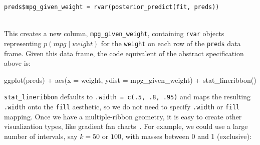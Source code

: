 \documentclass[journal]{vgtc}                     %
\newenvironment{centerverbatim}{%
\setlength{\parskip}{.4\belowdisplayskip}%
\vspace{.55\abovedisplayskip}%
\noindent%
\small%
\centering%
\varwidth{\linewidth}%
\verbatim
}{%
\endverbatim%
\endvarwidth%
\par%
\hfill\break%
}
\begin{document}
\begin{minipage}{\columnwidth}
\vspace{\abovedisplayskip}
\small
\centering
\begin{verbatim}
preds$mpg_given_weight = rvar(posterior_predict(fit, preds))
\end{verbatim}
\end{minipage}\vspace{\belowdisplayskip}\\
This creates a new column, \texttt{mpg\_given\_weight}, containing \texttt{rvar} objects representing $p(\textit{mpg} \mid \textit{weight})$ for the \texttt{weight} on each row of the \texttt{preds} data frame. Given this data frame, the code equivalent of the abstract specification above is:

\begin{centerverbatim}
ggplot(preds) +
  aes(x = weight, ydist = mpg_given_weight) +
  stat_lineribbon()
\end{centerverbatim}
\texttt{stat\_lineribbon} defaults to \texttt{.width = c(.5, .8, .95)} and maps the resulting \texttt{.width} onto the \texttt{fill} aesthetic, so we do not need to specify \texttt{.width} or \texttt{fill} mapping. Once we have a multiple-ribbon geometry, it is easy to create other visualization types, like gradient fan charts~\cite{bowman2019graphics,jackson2008displaying}. For example, we could use a large number of intervals, say $k = 50$ or $100$, with masses between 0 and 1 (exclusive):
\end{document}
